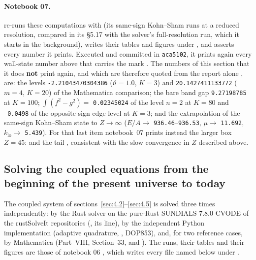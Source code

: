 \paragraph{Notebook 07.}  re-runs these
computations with  (its same-sign Kohn--Sham runs at a reduced resolution, compared
in its \S5.17 with the solver's full-resolution run, which it starts in the background), writes their
tables and figures under , and asserts every number it prints.
Executed and committed in \texttt{aca5102}, it prints again every wall-state number above that carries
the mark . The numbers of this section that it does \textbf{not} print again, and which
are therefore quoted from the report alone , are: the levels \texttt{-2.21043470304386}
($\vartheta=1.0$, $K=3$) and \texttt{20.1427411133772} ($m=4$, $K=20$) of the Mathematica comparison;
the bare band gap \texttt{9.27198785} at $K=100$; $\int(f^2-g^2)=$ \texttt{0.02345024} of the level
$n=2$ at $K=80$ and \texttt{-0.0498} of the opposite-sign edge level at $K=3$; and the extrapolation of
the same-sign Kohn--Sham state to $Z\to\infty$ ($E/A\to$ \texttt{936.46}--\texttt{936.53},
$\mu\to$ \texttt{11.692}, $k_{\mathrm{lo}}\to$ \texttt{5.439}). For that last item notebook~07 prints
instead the larger box $Z=45$:
and the tail 
, consistent with the slow convergence in $Z$ described above.

\subsection{Solving the coupled equations from the beginning of the present universe to today}
\label{sec:4.7}

The coupled system of sections~\ref{sec:4.2}--\ref{sec:4.5} is solved three times independently: by the Rust
solver  on the pure-Rust SUNDIALS 7.8.0 CVODE of the rustSolveIt repositories
(, its  line), by
the independent Python implementation  (adaptive quadrature,
, DOP853), and, for two reference cases, by Mathematica (Part~VIII, Section~33, and
). The runs, their tables and their figures are
those of notebook 06 , which writes every file named below under .

